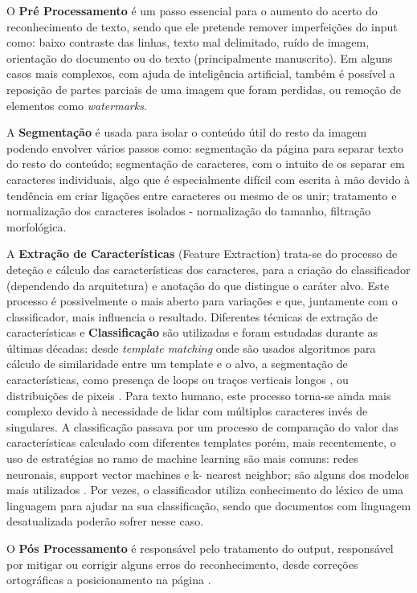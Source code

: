 O \textbf{Pré Processamento} é um passo essencial para o aumento do acerto do reconhecimento de texto, sendo que ele pretende remover imperfeições do input como: baixo contraste das linhas, texto mal delimitado, ruído de imagem, orientação do documento ou do texto (principalmente manuscrito). Em alguns casos mais complexos, com ajuda de inteligência artificial, também é possível a reposição de partes parciais de uma imagem que foram perdidas, ou remoção de elementos como \textit{watermarks}.

A \textbf{Segmentação} é usada para isolar o conteúdo útil do resto da imagem podendo envolver vários passos como: segmentação da página para separar texto do resto do conteúdo; segmentação de caracteres, com o intuito de os separar em caracteres individuais, algo que é especialmente difícil com escrita à mão devido à tendência  em criar ligações entre caracteres ou mesmo de os unir; tratamento e normalização dos caracteres isolados - normalização do tamanho, filtração morfológica.

A \textbf{Extração de Características} (Feature Extraction) trata-se do processo de deteção e cálculo das características dos caracteres, para a criação do classificador (dependendo da arquitetura) e anotação do que distingue o caráter alvo. Este processo é possivelmente o mais aberto para variações e que, juntamente com o classificador, mais influencia o resultado. Diferentes técnicas de extração de características e \textbf{Classificação} são utilizadas e foram estudadas durante as últimas décadas: desde \textit{template matching} \citep{10.5555/1074100.1074664} onde são usados algoritmos para cálculo de similaridade entre um template e o alvo, a segmentação de características, como presença de loops ou traços verticais longos  \citep{10.5555/1074100.1074664}, ou distribuições de pixeis \citep{9183326}. 
Para texto humano, este processo torna-se ainda mais complexo devido à necessidade  de lidar com múltiplos caracteres  invés de singulares. 
A classificação passava por um processo de comparação do valor das características calculado com diferentes templates porém, mais recentemente, o uso de estratégias no ramo de machine learning são mais comuns: redes neuronais, support vector machines e k- nearest neighbor; são alguns dos modelos mais utilizados \citep{9183326} \cite{6993174}. Por vezes, o classificador utiliza conhecimento do léxico de uma linguagem para ajudar na sua classificação, sendo que documentos com linguagem desatualizada poderão sofrer nesse caso.

O \textbf{Pós Processamento} é responsável pelo tratamento do output, responsável por mitigar ou corrigir alguns erros do reconhecimento, desde correções ortográficas a posicionamento na página \citep{9183326}.

